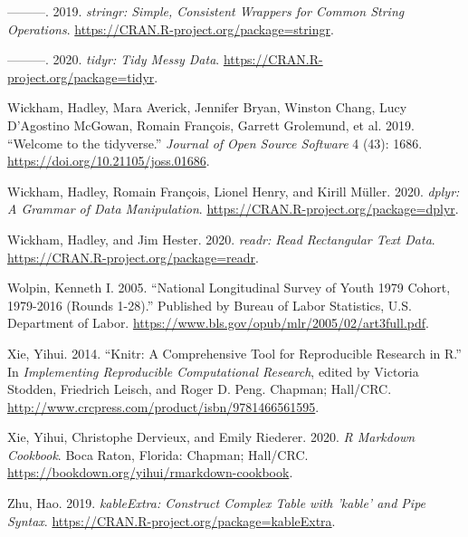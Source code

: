 \documentclass[12pt]{article}
\begin{document}
\leavevmode\hypertarget{ref-stringr}{}%
---------. 2019. \emph{stringr: Simple, Consistent Wrappers for Common String Operations}. \url{https://CRAN.R-project.org/package=stringr}.

\leavevmode\hypertarget{ref-tidyr}{}%
---------. 2020. \emph{tidyr: Tidy Messy Data}. \url{https://CRAN.R-project.org/package=tidyr}.

\leavevmode\hypertarget{ref-tidyverse}{}%
Wickham, Hadley, Mara Averick, Jennifer Bryan, Winston Chang, Lucy D'Agostino McGowan, Romain François, Garrett Grolemund, et al. 2019. ``Welcome to the tidyverse.'' \emph{Journal of Open Source Software} 4 (43): 1686. \url{https://doi.org/10.21105/joss.01686}.

\leavevmode\hypertarget{ref-dplyr}{}%
Wickham, Hadley, Romain François, Lionel Henry, and Kirill Müller. 2020. \emph{dplyr: A Grammar of Data Manipulation}. \url{https://CRAN.R-project.org/package=dplyr}.

\leavevmode\hypertarget{ref-readr}{}%
Wickham, Hadley, and Jim Hester. 2020. \emph{readr: Read Rectangular Text Data}. \url{https://CRAN.R-project.org/package=readr}.

\leavevmode\hypertarget{ref-nlsy79edu}{}%
Wolpin, Kenneth I. 2005. ``National Longitudinal Survey of Youth 1979 Cohort, 1979-2016 (Rounds 1-28).'' Published by Bureau of Labor Statistics, U.S. Department of Labor. \url{https://www.bls.gov/opub/mlr/2005/02/art3full.pdf}.

\leavevmode\hypertarget{ref-knitr}{}%
Xie, Yihui. 2014. ``Knitr: A Comprehensive Tool for Reproducible Research in R.'' In \emph{Implementing Reproducible Computational Research}, edited by Victoria Stodden, Friedrich Leisch, and Roger D. Peng. Chapman; Hall/CRC. \url{http://www.crcpress.com/product/isbn/9781466561595}.

\leavevmode\hypertarget{ref-rmarkdown}{}%
Xie, Yihui, Christophe Dervieux, and Emily Riederer. 2020. \emph{R Markdown Cookbook}. Boca Raton, Florida: Chapman; Hall/CRC. \url{https://bookdown.org/yihui/rmarkdown-cookbook}.

\leavevmode\hypertarget{ref-kableExtra}{}%
Zhu, Hao. 2019. \emph{kableExtra: Construct Complex Table with 'kable' and Pipe Syntax}. \url{https://CRAN.R-project.org/package=kableExtra}.



\end{document}
